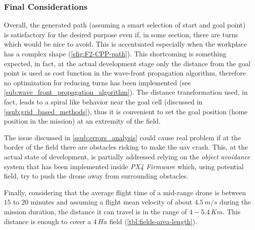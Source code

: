 \subsubsection{Final Considerations} %
\label{ssub:considerations}
Overall, the generated path (assuming a smart selection of start and goal point) is satisfactory for the desired purpose even if, in some section, there are turns which would be nice to avoid. This is accentuated especially when the workplace has a complex shape (\autoref{sfig:F2-CPP-path}). This shortcoming is something expected, in fact, at the actual development stage only the distance from the goal point is used as cost function in the wave-front propagation algorithm, therefore no optimization for reducing turns has been implemented (see \autoref{sub:wave_front_propagation_algorithm}). The distance transformation used, in fact, leads to a spiral like behavior near the goal cell (discussed in \autoref{ssub:grid_based_methods}), thus it is convenient to set the goal position (home position in the mission) at an extremity of the field. \par
The issue discussed in \autoref{ssub:errors_analysis} could cause real problem if at the border of the field there are obstacles risking to make the \acrshort{uav} crash. This, at the actual state of development, is partially addressed relying on the \textit{object avoidance} system that has been implemented inside \textit{PX4 Firmware} which, using potential field, try to push the drone away from surrounding obstacles.\par
Finally, considering that the average flight time of a mid-range drone is between $15$ to $20$ minutes and assuming a flight mean velocity of about $4.5\, m/s$ during the mission duration, the distance it can travel is in the range of $4-5.4\, Km$. This distance is enough to cover a $4\, Ha$ field (\autoref{tbl:fields-area-length}).


